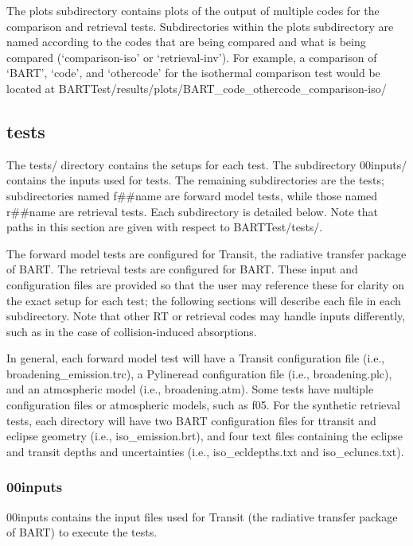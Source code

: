 \documentclass[letterpaper, 12pt]{article}
\begin{document}
The plots subdirectory contains plots of the output of multiple codes for 
the comparison and retrieval tests. Subdirectories within the plots 
subdirectory are named according to the codes that are being compared and 
what is being compared (`comparison-iso' or `retrieval-inv'). For example, a 
comparison of `BART', `code', and `othercode' for the isothermal comparison 
test would be located at 
BARTTest/results/plots/BART{\_}code{\_}othercode{\_}comparison-iso/

\subsection{tests}
\label{sec:tests}
The tests/ directory contains the setups for each test. The subdirectory 
00inputs/ contains the inputs used for tests. The remaining 
subdirectories are the tests; subdirectories named f{\#}{\#}name are forward 
model tests, while those named r{\#}{\#}name are retrieval tests. Each 
subdirectory is detailed below. Note that paths in this section are given 
with respect to BARTTest/tests/.

The forward model tests are configured for Transit, the radiative transfer 
package of BART. The retrieval tests are configured for BART. These 
input and configuration files are provided so that the user may reference 
these for clarity on the exact setup for each test; the following sections 
will describe each file in each subdirectory. Note that other RT or retrieval 
codes may handle inputs differently, such as in the case of collision-induced 
absorptions.

In general, each forward model test will have a Transit configuration 
file (i.e., broadening{\_}emission.trc), a Pylineread configuration file 
(i.e., broadening.plc), and an atmospheric model (i.e., broadening.atm). 
Some tests have multiple configuration files or atmospheric models, such as 
f05. For the synthetic retrieval tests, each directory 
will have two BART configuration files for ttransit and eclipse geometry 
(i.e., iso{\_}emission.brt), and four 
text files containing the eclipse and transit depths and uncertainties 
(i.e., iso{\_}ecldepths.txt and iso{\_}ecluncs.txt).

\subsubsection{00inputs}
\label{sec:inputs}
00inputs contains the input files used for Transit (the radiative transfer 
package of BART) to execute the tests.
\end{document}
